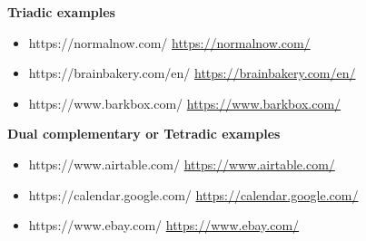 \textbf{Triadic examples}

\begin{itemize}
\item https://normalnow.com/ \url{https://normalnow.com/} 
\item https://brainbakery.com/en/ \url{https://brainbakery.com/en/} 
\item https://www.barkbox.com/ \url{https://www.barkbox.com/}
\end{itemize}

\textbf{Dual complementary or Tetradic examples}

\begin{itemize}
\item https://www.airtable.com/ \url{https://www.airtable.com/} 
\item https://calendar.google.com/ \url{https://calendar.google.com/} 
\item https://www.ebay.com/ \url{https://www.ebay.com/}
\end{itemize}

